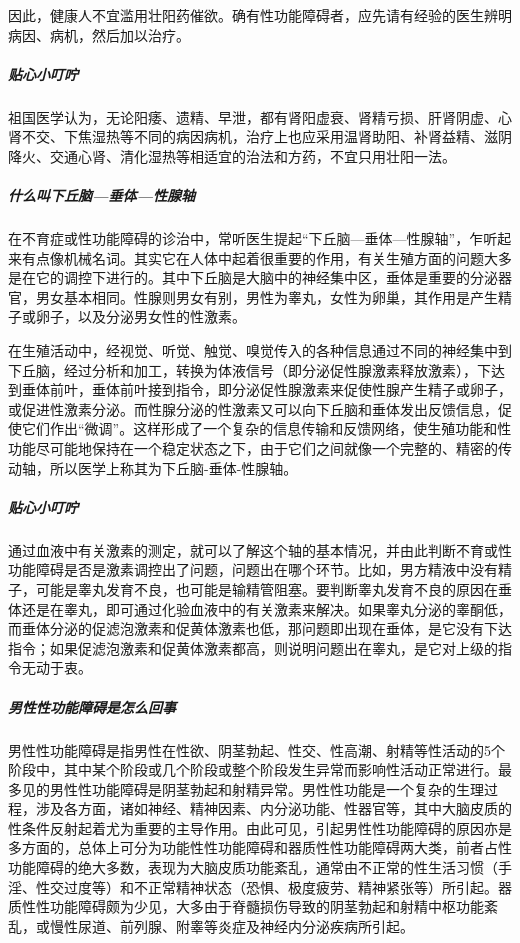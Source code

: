 \begin{enumerate}
因此，健康人不宜滥用壮阳药催欲。确有性功能障碍者，应先请有经验的医生辨明病因、病机，然后加以治疗。

\subparagraph{贴心小叮咛}

祖国医学认为，无论阳痿、遗精、早泄，都有肾阳虚衰、肾精亏损、肝肾阴虚、心肾不交、下焦湿热等不同的病因病机，治疗上也应采用温肾助阳、补肾益精、滋阴降火、交通心肾、清化湿热等相适宜的治法和方药，不宜只用壮阳一法。

\subparagraph{什么叫下丘脑—垂体—性腺轴}

在不育症或性功能障碍的诊治中，常听医生提起“下丘脑—垂体—性腺轴”，乍听起来有点像机械名词。其实它在人体中起着很重要的作用，有关生殖方面的问题大多是在它的调控下进行的。其中下丘脑是大脑中的神经集中区，垂体是重要的分泌器官，男女基本相同。性腺则男女有别，男性为睾丸，女性为卵巢，其作用是产生精子或卵子，以及分泌男女性的性激素。

在生殖活动中，经视觉、听觉、触觉、嗅觉传入的各种信息通过不同的神经集中到下丘脑，经过分析和加工，转换为体液信号（即分泌促性腺激素释放激素），下达到垂体前叶，垂体前叶接到指令，即分泌促性腺激素来促使性腺产生精子或卵子，或促进性激素分泌。而性腺分泌的性激素又可以向下丘脑和垂体发出反馈信息，促使它们作出“微调”。这样形成了一个复杂的信息传输和反馈网络，使生殖功能和性功能尽可能地保持在一个稳定状态之下，由于它们之间就像一个完整的、精密的传动轴，所以医学上称其为下丘脑-垂体-性腺轴。

\subparagraph{贴心小叮咛}

通过血液中有关激素的测定，就可以了解这个轴的基本情况，并由此判断不育或性功能障碍是否是激素调控出了问题，问题出在哪个环节。比如，男方精液中没有精子，可能是睾丸发育不良，也可能是输精管阻塞。要判断睾丸发育不良的原因在垂体还是在睾丸，即可通过化验血液中的有关激素来解决。如果睾丸分泌的睾酮低，而垂体分泌的促滤泡激素和促黄体激素也低，那问题即出现在垂体，是它没有下达指令；如果促滤泡激素和促黄体激素都高，则说明问题出在睾丸，是它对上级的指令无动于衷。

\subparagraph{男性性功能障碍是怎么回事}

男性性功能障碍是指男性在性欲、阴茎勃起、性交、性高潮、射精等性活动的5个阶段中，其中某个阶段或几个阶段或整个阶段发生异常而影响性活动正常进行。最多见的男性性功能障碍是阴茎勃起和射精异常。男性性功能是一个复杂的生理过程，涉及各方面，诸如神经、精神因素、内分泌功能、性器官等，其中大脑皮质的性条件反射起着尤为重要的主导作用。由此可见，引起男性性功能障碍的原因亦是多方面的，总体上可分为功能性性功能障碍和器质性性功能障碍两大类，前者占性功能障碍的绝大多数，表现为大脑皮质功能紊乱，通常由不正常的性生活习惯（手淫、性交过度等）和不正常精神状态（恐惧、极度疲劳、精神紧张等）所引起。器质性性功能障碍颇为少见，大多由于脊髓损伤导致的阴茎勃起和射精中枢功能紊乱，或慢性尿道、前列腺、附睾等炎症及神经内分泌疾病所引起。


\end{enumerate}
